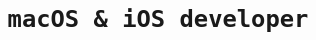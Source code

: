\documentclass[10pt,a4paper,sans]{moderncv}
\title{\texttt{macOS \& iOS developer}}
\begin{document}
\makecvtitle{}









\end{document}
